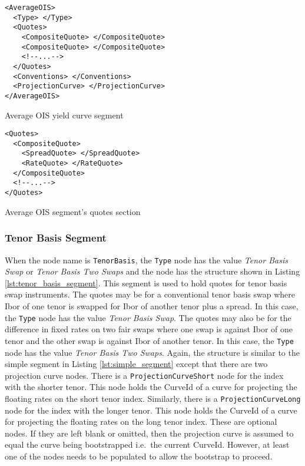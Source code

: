 \begin{listing}[H]
\begin{verbatim}
<AverageOIS>
  <Type> </Type>
  <Quotes>
    <CompositeQuote> </CompositeQuote>
    <CompositeQuote> </CompositeQuote>
    <!--...-->
  </Quotes>
  <Conventions> </Conventions>
  <ProjectionCurve> </ProjectionCurve>
</AverageOIS>
\end{verbatim}
\caption{Average OIS yield curve segment}
\label{lst:average_ois_segment}
\end{listing}

\begin{listing}[H]
\begin{verbatim}
<Quotes>
  <CompositeQuote>
    <SpreadQuote> </SpreadQuote>
    <RateQuote> </RateQuote>
  </CompositeQuote>
  <!--...-->
</Quotes>
\end{verbatim}
\caption{Average OIS segment's quotes section}
\label{lst:average_ois_quotes}
\end{listing}

\subsubsection*{Tenor Basis Segment}
When the node name is \lstinline!TenorBasis!, the \lstinline!Type! node has the value \emph{Tenor Basis Swap} or
\emph{Tenor Basis Two Swaps} and the node has the structure shown in Listing \ref{lst:tenor_basis_segment}. This segment
is used to hold quotes for tenor basis swap instruments. The quotes may be for a conventional tenor basis swap where
Ibor of one tenor is swapped for Ibor of another tenor plus a spread. In this case, the \lstinline!Type! node has the
value \emph{Tenor Basis Swap}. The quotes may also be for the difference in fixed rates on two fair swaps where one swap
is against Ibor of one tenor and the other swap is against Ibor of another tenor. In this case, the \lstinline!Type!
node has the value \emph{Tenor Basis Two Swaps}. Again, the structure is similar to the simple segment in Listing
\ref{lst:simple_segment} except that there are two projection curve nodes. There is a \lstinline!ProjectionCurveShort!
node for the index with the shorter tenor. This node holds the CurveId of a curve for projecting the floating rates on
the short tenor index. Similarly, there is a \lstinline!ProjectionCurveLong! node for the index with the longer
tenor. This node holds the CurveId of a curve for projecting the floating rates on the long tenor index. These are
optional nodes. If they are left blank or omitted, then the projection curve is assumed to equal the curve being
bootstrapped i.e.\ the current CurveId. However, at least one of the nodes needs to be populated to allow the bootstrap
to proceed.

